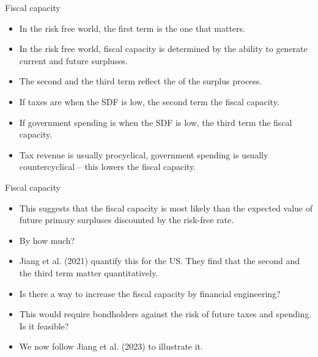 \documentclass[11pt,xcolor={dvipsnames},aspectratio=159,hyperref={pdftex,pdfpagemode=UseNone,hidelinks,pdfdisplaydoctitle=true},usepdftitle=false]{beamer}
\begin{document}
\begin{frame}{Fiscal capacity}  
    \begin{itemize}
        \item In the risk free world, the first term is the  one that matters.
        \item In the risk free world, fiscal capacity is determined  by the ability to generate current and future surpluses.
        \item The second and the third term reflect
        the  of the surplus process.
        \item If taxes are  when the SDF is low, the second term  the fiscal capacity.
        \item If government spending is  when the SDF is low, the third term  the fiscal capacity.
        \item Tax revenue is usually procyclical, government spending is usually countercyclical -- this lowers the fiscal capacity.
     \end{itemize}
\end{frame}

\begin{frame}{Fiscal capacity}  
    \begin{itemize}
        \item This suggests that the fiscal capacity is most likely  than the expected value of future primary surpluses discounted by the risk-free rate.
        \item By how much?
        \item Jiang et al. (2021) quantify this for the US. They find that the second and the third term matter quantitatively. 
        \item Is there a way to increase the fiscal capacity by financial engineering?
        \item This would require  bondholders against the risk of future taxes and spending. Is it feasible?
        \item We now follow Jiang et al. (2023) to illustrate it.
     \end{itemize}
\end{frame}
\end{document}
